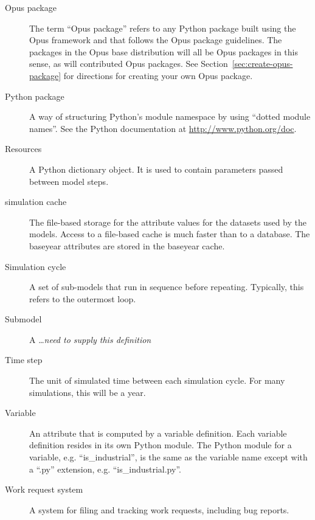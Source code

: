 \begin{description}
\item[Opus package]  The term ``Opus package'' refers to 
any Python \pythonindex package built using the Opus framework and that follows
the Opus package guidelines.  The packages in the Opus base distribution
will all be Opus packages in this sense, as will contributed Opus packages. See
Section~\ref{sec:create-opus-package} for directions for creating your own Opus
package. 

\item[Python package] \pythonpackagesindex
A way of structuring Python's \pythonindex module namespace by using ``dotted module
names''.  See the Python \pythonindex documentation at \url{http://www.python.org/doc}.

\item[Resources]  
A Python \pythonindex dictionary object.  It is used to contain parameters passed
between model steps.

\item[simulation cache] \simulationcacheindex
The file-based storage for the attribute values for the datasets \datasetindex used by the
models. Access to a file-based cache is much faster than to a database.  The
baseyear attributes \attributesindex are stored in the baseyear cache. \baseyearcacheindex

\item[]\item[Simulation cycle] 
A set of sub-models that run in sequence before repeating.
Typically, this refers to the outermost loop.

\item[Submodel] 
A \ldots \emph{need to supply this definition}

\item[Time step] 
The unit of simulated time between each simulation cycle. For many
simulations, this will be a year.

\item[Variable] \variablesindex
An attribute \attributesindex that is computed by a variable \variablesindex definition.  Each
variable \variablesindex definition resides in its own Python \pythonindex module.  The 
Python \pythonindex module for a variable, \variablesindex e.g. ``is_industrial'', is the
same as the variable \variablesindex name except with a ``.py'' extension, 
e.g. ``is_industrial.py''.  

\item[Work request system] 
A system for filing and tracking work requests, including bug
reports.

\end{description}

